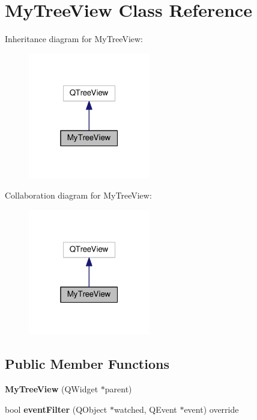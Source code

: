 \hypertarget{class_my_tree_view}{}\section{My\+Tree\+View Class Reference}
\label{class_my_tree_view}


Inheritance diagram for My\+Tree\+View\+:\nopagebreak
\begin{figure}[H]
\begin{center}
\leavevmode
\includegraphics[width=151pt]{class_my_tree_view__inherit__graph}
\end{center}
\end{figure}


Collaboration diagram for My\+Tree\+View\+:\nopagebreak
\begin{figure}[H]
\begin{center}
\leavevmode
\includegraphics[width=151pt]{class_my_tree_view__coll__graph}
\end{center}
\end{figure}
\subsection*{Public Member Functions}
\begin{DoxyCompactItemize}
\item 
{\bfseries My\+Tree\+View} (Q\+Widget $\ast$parent)\hypertarget{class_my_tree_view_a0152950a0b3c03fa3c17f2b5bcacfde1}{}\label{class_my_tree_view_a0152950a0b3c03fa3c17f2b5bcacfde1}

\item 
bool {\bfseries event\+Filter} (Q\+Object $\ast$watched, Q\+Event $\ast$event) override\hypertarget{class_my_tree_view_aa40b314b7834999905769ac19a21ad7d}{}\label{class_my_tree_view_aa40b314b7834999905769ac19a21ad7d}

\end{DoxyCompactItemize}
